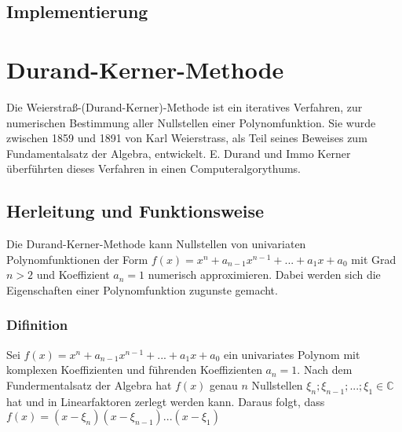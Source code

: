 \documentclass[12pt]{article}
\begin{document}
    \subsection{Implementierung}

\section{Durand-Kerner-Methode} 
    Die Weierstraß-(Durand-Kerner)-Methode ist ein iteratives Verfahren, zur numerischen Bestimmung aller Nullstellen einer Polynomfunktion. Sie wurde zwischen 1859 und 1891 von Karl Weierstrass, als Teil seines Beweises zum Fundamentalsatz der Algebra, entwickelt. E. Durand und Immo Kerner überführten dieses Verfahren in einen Computeralgorythums.

    \subsection{Herleitung und Funktionsweise}
        Die Durand-Kerner-Methode kann Nullstellen von univariaten Polynomfunktionen der Form $f(x) = x^n + a_{n-1} x^{n-1} + ... + a_1 x + a_0$ mit Grad $n > 2$ und Koeffizient $a_n = 1$ numerisch approximieren. Dabei werden sich die Eigenschaften einer Polynomfunktion zugunste gemacht.
    \subsubsection{Difinition}
        Sei $f(x) = x^n + a_{n-1} x^{n-1} + ... + a_1 x + a_0$ ein univariates Polynom mit komplexen Koeffizienten und führenden Koeffizienten $a_n = 1$. Nach dem Fundermentalsatz der Algebra hat $f(x)$ genau $n$ Nullstellen $\xi_n;\xi_{n-1};...;\xi_1 \in \mathbb{C}$ hat und in Linearfaktoren zerlegt werden kann. Daraus folgt, dass $f(x) = (x - \xi_n)(x - \xi_{n-1})...(x - \xi_1)$ 
\end{document}
